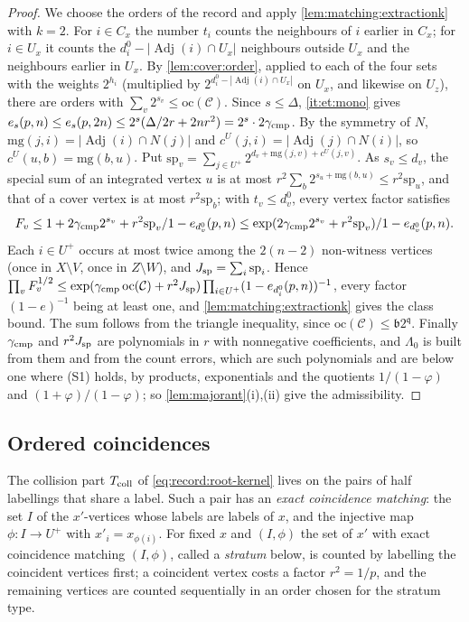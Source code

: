 \begin{proof}
We choose the orders of the record and apply \cref{lem:matching:extractionk} with
$k=2$. For $i\in C_x$ the number $t_i$ counts the neighbours of $i$ earlier in
$C_x$; for $i\in U_x$ it counts the $d^0_i-|\operatorname{Adj}(i)\cap U_x|$
neighbours outside $U_x$ and the neighbours earlier in $U_x$. By
\cref{lem:cover:order}, applied to each of the four sets with the weights
$2^{h_i}$ (multiplied by $2^{d^0_i-|\operatorname{Adj}(i)\cap U_x|}$ on $U_x$, and
likewise on $U_z$), there are orders with $\sum_v2^{s_v}\le\mathrm{oc}(\mathcal C)$.
Since $s\le\Delta$, \ref{it:et:mono} gives
$e_s(p,n)\le e_s(p,2n)\le2^s(\frac\Delta2r+2nr^2)=2^s\cdot2\gamma_{\rm cmp}$. By the
symmetry of $N$, $\mathrm{mg}(j,i)=|\operatorname{Adj}(i)\cap N(j)|$ and
$c^U(j,i)=|\operatorname{Adj}(j)\cap N(i)|$, so $c^U(u,b)=\mathrm{mg}(b,u)$. Put
$\mathrm{sp}_v=\sum_{j\in U^+}2^{d_v+\mathrm{mg}(j,v)+c^U(j,v)}$. As $s_v\le d_v$, the
special sum of an integrated vertex $u$ is at most
$r^2\sum_b2^{s_u+\mathrm{mg}(b,u)}\le r^2\mathrm{sp}_u$, and that of a cover vertex
is at most $r^2\mathrm{sp}_b$; with $t_v\le d^0_v$, every vertex factor satisfies
\[
 F_v\le\frac{1+2\gamma_{\rm cmp}2^{s_v}+r^2\mathrm{sp}_v}{1-e_{d^0_v}(p,n)}
 \le\frac{\exp(2\gamma_{\rm cmp}2^{s_v}+r^2\mathrm{sp}_v)}{1-e_{d^0_v}(p,n)}.
\]
Each $i\in U^+$ occurs at most twice among the $2(n-2)$ non-witness vertices (once
in $X\setminus V$, once in $Z\setminus W$), and $J_{\rm sp}=\sum_i\mathrm{sp}_i$.
Hence $\prod_vF_v^{1/2}\le\exp(\gamma_{\rm cmp}\,\mathrm{oc}(\mathcal C)+r^2J_{\rm sp})
\prod_{i\in U^+}(1-e_{d^0_i}(p,n))^{-1}$, every factor $(1-e)^{-1}$ being at least
one, and \cref{lem:matching:extractionk} gives the class bound. The sum follows from
the triangle inequality, since $\mathrm{oc}(\mathcal C)\le\mathfrak b2^{\mathfrak q}$.
Finally $\gamma_{\rm cmp}$ and $r^2J_{\rm sp}$ are polynomials in $r$ with nonnegative
coefficients, and $\Lambda_0$ is built from them and from the count errors, which are
such polynomials and are below one where (S1) holds, by products, exponentials and the
quotients $1/(1-\varphi)$ and $(1+\varphi)/(1-\varphi)$; so \cref{lem:majorant}(i),(ii)
give the admissibility.
\end{proof}

\subsection{Ordered coincidences}\label{subsec:extraction:coincidences}

The collision part $T_{\rm coll}$ of \eqref{eq:record:root-kernel} lives on the
pairs of half labellings that share a label. Such a pair has an \emph{exact
coincidence matching}: the set $I$ of the $x'$-vertices whose labels are labels of
$x$, and the injective map $\phi\colon I\to U^+$ with $x'_i=x_{\phi(i)}$. For fixed
$x$ and $(I,\phi)$ the set of $x'$ with exact coincidence matching
$(I,\phi)$, called a \emph{stratum} below, is counted by labelling the
coincident vertices first;
a coincident vertex costs a factor $r^2=1/p$, and the remaining vertices are
counted sequentially in an order chosen for the stratum type.

